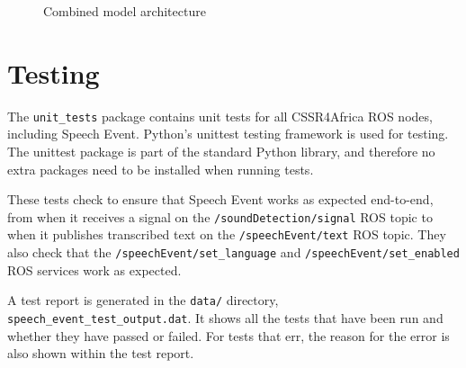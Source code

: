 \documentclass{CSSRforAfrica}
\begin{document}
\begin{figure}[thb]
\begin{center}
\end{center}
\caption{Combined model architecture}
\label{fig:combined}
\end{figure}


\newpage
\section{Testing}
The \texttt{unit\_tests} package contains unit tests for all CSSR4Africa ROS nodes, including Speech Event. Python's unittest testing framework is used for testing. The unittest package is part of the standard Python library, and therefore no extra packages need to be installed when running tests.

These tests check to ensure that Speech Event works as expected end-to-end, from when it receives a signal on the \texttt{/soundDetection/signal} ROS topic to when it publishes transcribed text on the \texttt{/speechEvent/text} ROS topic. They also check that the \texttt{/speechEvent/set\_language} and \texttt{/speechEvent/set\_enabled} ROS services work as expected.

A test report is generated in the \texttt{data/} directory, \texttt{speech\_event\_test\_output.dat}. It shows all the tests that have been run and whether they have passed or failed. For tests that err, the reason for the error is also shown within the test report.
\end{document}
